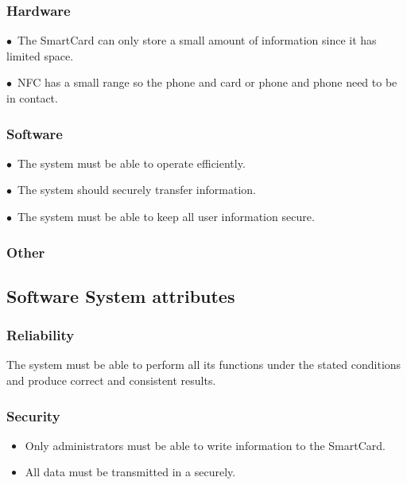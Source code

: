 \documentclass[english]{article}
\begin{document}
				 \subsubsection{Hardware}
				
						$\bullet$\ The SmartCard can only store a small amount of information since it has limited space.

						$\bullet$\  NFC has a small range so the phone and card or phone and phone need to be in contact.
					
				
				 \subsubsection{Software}
					
					$\bullet$\ The system must be able to operate efficiently.

					$\bullet$\ The system should securely transfer information.

                                                     $\bullet$\  The system must be able to keep all user information secure.
					
				 \subsubsection{Other}
				
					
									\newpage
				\subsection{Software System attributes}
				
				\subsubsection{Reliability}
    				The system must be able to perform all its functions under the stated conditions and produce correct and consistent results. 
    				
				
				\subsubsection{Security}
    					\begin{itemize}
					\item Only administrators must be able to write information to the SmartCard.
					\item All data must be transmitted in a securely.

					\end{itemize}
    				
\end{document}
